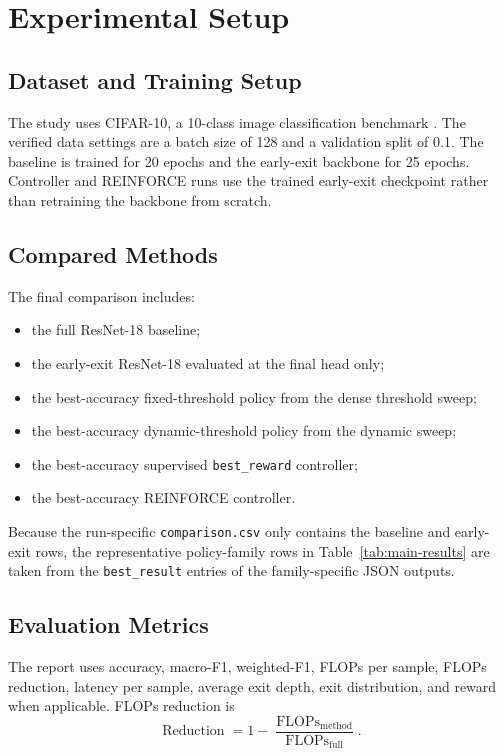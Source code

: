\documentclass[10pt,twocolumn]{article}
\newcommand{\dataset}{CIFAR-10}
\newcommand{\backbone}{ResNet-18}
\begin{document}
\section{Experimental Setup}

\subsection{Dataset and Training Setup}

The study uses \dataset{}, a 10-class image classification benchmark \cite{krizhevsky2009cifar}. The verified data settings are a batch size of 128 and a validation split of 0.1. The baseline is trained for 20 epochs and the early-exit backbone for 25 epochs. Controller and REINFORCE runs use the trained early-exit checkpoint rather than retraining the backbone from scratch.

\subsection{Compared Methods}

The final comparison includes:
\begin{itemize}
    \item the full \backbone{} baseline;
    \item the early-exit \backbone{} evaluated at the final head only;
    \item the best-accuracy fixed-threshold policy from the dense threshold sweep;
    \item the best-accuracy dynamic-threshold policy from the dynamic sweep;
    \item the best-accuracy supervised \texttt{best\_reward} controller;
    \item the best-accuracy REINFORCE controller.
\end{itemize}

Because the run-specific \texttt{comparison.csv} only contains the baseline and early-exit rows, the representative policy-family rows in Table~\ref{tab:main-results} are taken from the \texttt{best\_result} entries of the family-specific JSON outputs.

\subsection{Evaluation Metrics}

The report uses accuracy, macro-F1, weighted-F1, FLOPs per sample, FLOPs reduction, latency per sample, average exit depth, exit distribution, and reward when applicable. FLOPs reduction is
\begin{equation}
    \operatorname{Reduction}
    =
    1 -
    \frac{\operatorname{FLOPs}_{\text{method}}}
    {\operatorname{FLOPs}_{\text{full}}}.
\end{equation}
\end{document}
